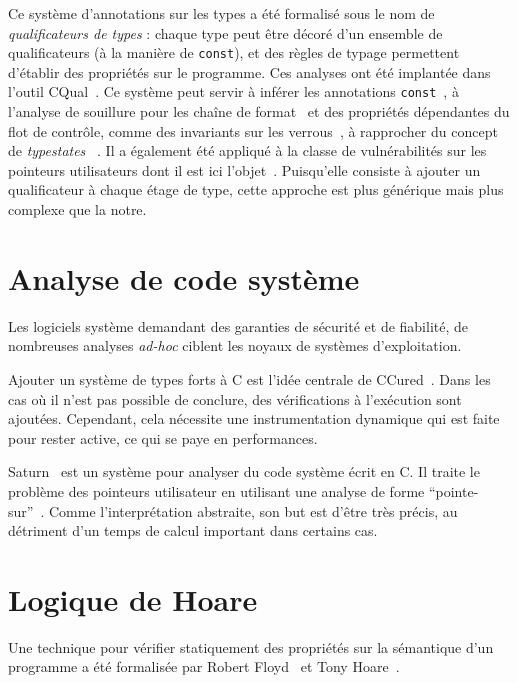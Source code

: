 Ce système d'annotations sur les types a été formalisé sous le nom de
\emph{qualificateurs de types} : chaque type peut être décoré d'un ensemble de
qualificateurs (à la manière de \texttt{const}), et des règles de typage
permettent d'établir des propriétés sur le programme. Ces analyses ont été
implantée dans l'outil CQual~\cite{toplas-quals}. Ce système peut servir à
inférer les annotations \texttt{const}~\cite{pldi99}, à l'analyse de souillure
pour les chaîne de format~\cite{usenix01} %
et des propriétés dépendantes du flot de contrôle, comme des invariants sur les
verrous~\cite{pldi02}, à rapprocher du concept de \emph{typestates}
~\cite{tse12-typestate}. Il a également été appliqué à la classe de
vulnérabilités sur les pointeurs utilisateurs dont il est ici
l'objet~\cite{cquk-usenix04}. Puisqu'elle consiste à ajouter un qualificateur à
chaque étage de type, cette approche est plus générique mais plus complexe que
la notre. %

\section{Analyse de code système}

Les logiciels système demandant des garanties de sécurité et de fiabilité, de
nombreuses analyses \emph{ad-hoc} ciblent les noyaux de systèmes d'exploitation.

Ajouter un système de types forts à C est l'idée centrale de
CCured~\cite{ccured-toplas}. Dans les cas où il n'est pas possible de conclure,
des vérifications à l'exécution sont ajoutées. Cependant, cela nécessite une
instrumentation dynamique qui est faite pour rester active, ce qui se paye en
performances.

Saturn~\cite{paste07} est un système pour analyser du code système écrit en C.
Il traite le problème des pointeurs utilisateur en utilisant une analyse de
forme ``pointe-sur''~\cite{oakland08}. Comme l'interprétation abstraite, son but
est d'être très précis, au détriment d'un temps de calcul important dans
certains cas.

\section{Logique de Hoare}

Une technique pour vérifier statiquement des propriétés sur la sémantique d'un
programme a été formalisée par Robert Floyd~\cite{FloydMeaning} et Tony
Hoare~\cite{hoare}.

